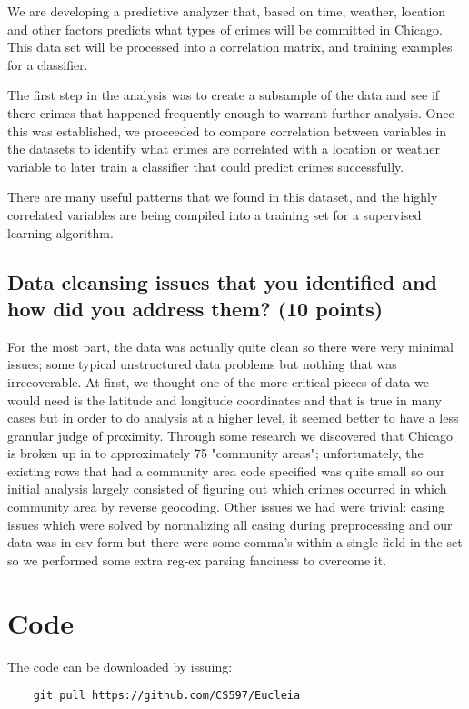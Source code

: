 \documentclass[a4paper,10pt]{article}
\begin{document}
We are developing a predictive analyzer that, based on time, weather, location and other factors predicts what types of crimes will be committed in Chicago. This data set will be processed into a correlation matrix, and training examples for a classifier. 

The first step in the analysis was to create a subsample of the data and see if there crimes that happened frequently enough to warrant further analysis. Once this was established, we proceeded to compare correlation between variables in the datasets to identify what crimes are correlated with a location or weather variable to later train a classifier that could predict crimes successfully.

There are many useful patterns that we found in this dataset, and the highly correlated variables are being compiled into a training set for a supervised learning algorithm.


\subsection*{Data cleansing issues that you identified and how did you address them? (10 points)}

For the most part, the data was actually quite clean so there were very minimal issues; some typical unstructured data problems but nothing that was irrecoverable. At first, we thought one of the more critical pieces of data we would need is the latitude and longitude coordinates and that is true in many cases but in order to do analysis at a higher level, it seemed better to have a less granular judge of proximity. Through some research we discovered that Chicago is broken up in to approximately 75 "community areas"; unfortunately, the existing rows that had a community area code specified was quite small so our initial analysis largely consisted of figuring out which crimes occurred in which community area by reverse geocoding. Other issues we had were trivial: casing issues which were solved by normalizing all casing during preprocessing and our data was in csv form but there were some comma's within a single field in the set so we performed some extra reg-ex parsing fanciness to overcome it.

\section*{Code}

The code can be downloaded by issuing:

\begin{verbatim}
	git pull https://github.com/CS597/Eucleia
\end{verbatim}
\end{document}
